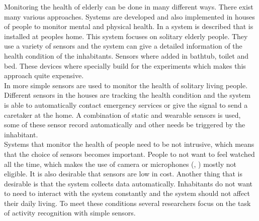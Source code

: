 \documentclass[a4paper,fleqn]{article}
\begin{document}






Monitoring the health of elderly can be done in many different ways. There exist many various approaches. Systems are developed and also implemented in houses of people to monitor mental and physical health. In \cite{Tamura1998573} a system is described that is installed at peoples home. This system focuses on solitary elderly people. They use a variety of sensors and the system can give a detailed information of the health condition of the inhabitants. Sensors where added in bathtub, toilet and bed. These devices where specially build for the experiments which makes this approach quite expensive.\\
In \cite{Kwon20125774} more simple sensors are used to monitor the health of solitary living people. Different sensors in the houses are tracking the health condition and the system is able to automatically contact emergency services or give the signal to send a caretaker at the home. A combination of static and wearable sensors is used, some of these sensor record automatically and other needs be triggered by the inhabitant.\\
Systems that monitor the health of people need to be not intrusive, which means that the choice of sensors becomes important. People to not want to feel watched all the time, which makes the use of camera or microphones (\cite{Nagai2010204}, \cite{Wu_2003_4676}) mostly not eligible.
It is also desirable that sensors are low in cost. Another thing that is desirable is that the system collects data automatically. Inhabitants do not want to need to interact with the system constantly and the system should not affect their daily living. To meet these conditions several researchers focus on the task of activity recognition with simple sensors.\\
\end{document}
